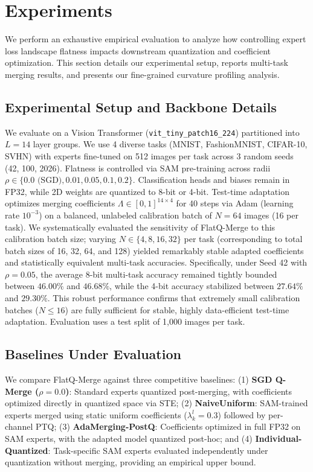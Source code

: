 \section{Experiments}
\label{sec:experiments}

We perform an exhaustive empirical evaluation to analyze how controlling expert loss landscape flatness impacts downstream quantization and coefficient optimization. This section details our experimental setup, reports multi-task merging results, and presents our fine-grained curvature profiling analysis.

\subsection{Experimental Setup and Backbone Details}
We evaluate on a Vision Transformer (\texttt{vit\_tiny\_patch16\_224}) \cite{Dosovitskiy2020ViT} partitioned into $L=14$ layer groups. We use 4 diverse tasks (MNIST, FashionMNIST, CIFAR-10, SVHN) with experts fine-tuned on 512 images per task across 3 random seeds (42, 100, 2026). Flatness is controlled via SAM \cite{Foret2020SAM} pre-training across radii $\rho \in \{0.0 \text{ (SGD)}, 0.01, 0.05, 0.1, 0.2\}$. Classification heads and biases remain in FP32, while 2D weights are quantized to 8-bit or 4-bit. Test-time adaptation optimizes merging coefficients $\Lambda \in [0, 1]^{14 \times 4}$ for 40 steps via Adam (learning rate $10^{-3}$) on a balanced, unlabeled calibration batch of $N=64$ images (16 per task). We systematically evaluated the sensitivity of FlatQ-Merge to this calibration batch size; varying $N \in \{4, 8, 16, 32\}$ per task (corresponding to total batch sizes of 16, 32, 64, and 128) yielded remarkably stable adapted coefficients and statistically equivalent multi-task accuracies. Specifically, under Seed 42 with $\rho=0.05$, the average 8-bit multi-task accuracy remained tightly bounded between $46.00\%$ and $46.68\%$, while the 4-bit accuracy stabilized between $27.64\%$ and $29.30\%$. This robust performance confirms that extremely small calibration batches ($N \le 16$) are fully sufficient for stable, highly data-efficient test-time adaptation. Evaluation uses a test split of 1,000 images per task.

\subsection{Baselines Under Evaluation}
We compare FlatQ-Merge against three competitive baselines: (1) \textbf{SGD Q-Merge ($\rho=0.0$)}: Standard experts quantized post-merging, with coefficients optimized directly in quantized space via STE; (2) \textbf{NaiveUniform}: SAM-trained experts merged using static uniform coefficients ($\lambda^l_k=0.3$) followed by per-channel PTQ; (3) \textbf{AdaMerging-PostQ}: Coefficients optimized in full FP32 on SAM experts, with the adapted model quantized post-hoc; and (4) \textbf{Individual-Quantized}: Task-specific SAM experts evaluated independently under quantization without merging, providing an empirical upper bound.

